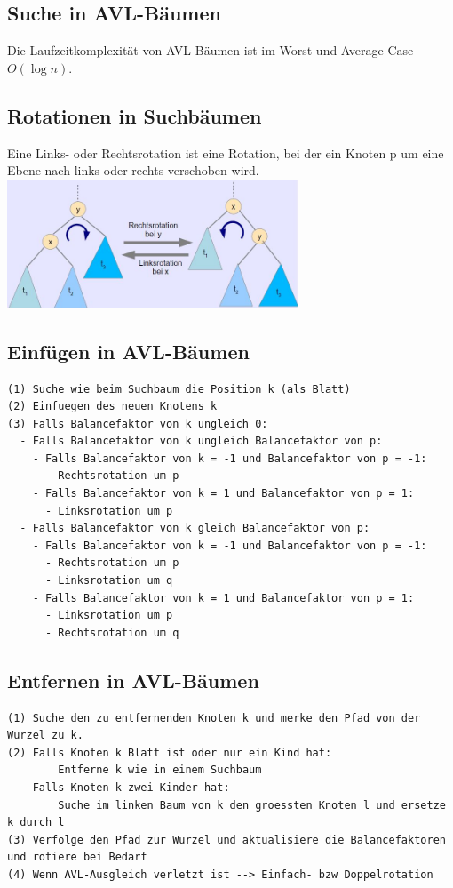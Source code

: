 \documentclass{scrreprt}
\begin{document}
\subsection{Suche in AVL-Bäumen}
Die Laufzeitkomplexität von AVL-Bäumen ist im Worst und Average Case $O(\log n)$.
\subsection{Rotationen in Suchbäumen}
Eine Links- oder Rechtsrotation ist eine Rotation, bei der ein Knoten p um eine Ebene nach links oder rechts verschoben wird.
\\\includegraphics[width=0.65\textwidth]{graphics/Rotationen}
\subsection{Einfügen in AVL-Bäumen}
\begin{lstlisting}
(1) Suche wie beim Suchbaum die Position k (als Blatt)
(2) Einfuegen des neuen Knotens k
(3) Falls Balancefaktor von k ungleich 0:
  - Falls Balancefaktor von k ungleich Balancefaktor von p:
    - Falls Balancefaktor von k = -1 und Balancefaktor von p = -1:
      - Rechtsrotation um p
    - Falls Balancefaktor von k = 1 und Balancefaktor von p = 1:
      - Linksrotation um p
  - Falls Balancefaktor von k gleich Balancefaktor von p:
    - Falls Balancefaktor von k = -1 und Balancefaktor von p = -1:
      - Rechtsrotation um p
      - Linksrotation um q
    - Falls Balancefaktor von k = 1 und Balancefaktor von p = 1:
      - Linksrotation um p
      - Rechtsrotation um q
\end{lstlisting}
\subsection{Entfernen in AVL-Bäumen}
\begin{lstlisting}
(1) Suche den zu entfernenden Knoten k und merke den Pfad von der Wurzel zu k.
(2) Falls Knoten k Blatt ist oder nur ein Kind hat:
        Entferne k wie in einem Suchbaum
    Falls Knoten k zwei Kinder hat:
        Suche im linken Baum von k den groessten Knoten l und ersetze k durch l
(3) Verfolge den Pfad zur Wurzel und aktualisiere die Balancefaktoren und rotiere bei Bedarf
(4) Wenn AVL-Ausgleich verletzt ist --> Einfach- bzw Doppelrotation
\end{lstlisting}
\end{document}
